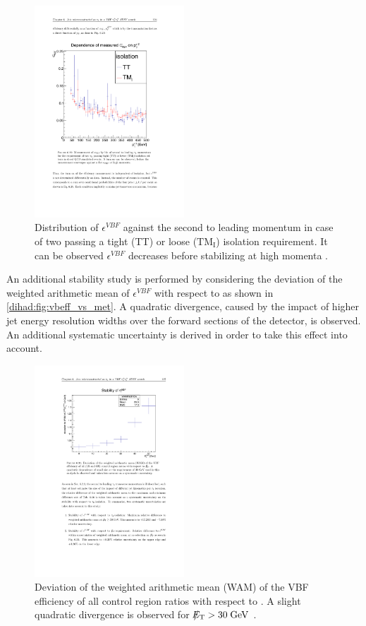  \begin{figure}[!h]
	\centering
	\includegraphics[width=0.5\textwidth]{analysis/pics/vbeff_vs_tauiso.pdf}
	\caption{Distribution of $\epsilon^{VBF}$ against the second to leading \hadtau momentum in case of two \hadtau passing a tight (TT) or loose ($\text{TM}_{\text{I}}$) isolation requirement. It can be observed $\epsilon^{VBF}$ decreases before stabilizing at high momenta \cite{bib:phdthesis:denis}.}
	\label{dihad:fig:vbeff_vs_tauiso}
\end{figure}

An additional stability study is performed by considering the deviation of the weighted arithmetic mean of $\epsilon^{VBF}$ with respect to \met as shown in \autoref{dihad:fig:vbeff_vs_met}. A quadratic divergence, caused by the impact of higher jet energy resolution widths over the forward sections of the detector, is observed. An additional systematic uncertainty is derived in order to take this effect into account.

\begin{figure}[!h]
	\centering
	\includegraphics[width=0.5\textwidth]{analysis/pics/vbeff_vs_met.pdf}
	\caption{Deviation of the weighted arithmetic mean (WAM) of the VBF efficiency of all control region ratios with respect to \met. A slight quadratic divergence is observed for $\slash\mkern-12mu{E}_{\text{T}} > 30\;\text{Ge}\kern-0.06667em\text{V}$ \cite{bib:phdthesis:denis}.}
	\label{dihad:fig:vbeff_vs_met}
\end{figure}
 
